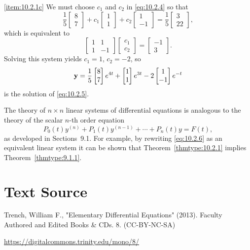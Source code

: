 \documentclass{ximera}
\begin{document}
\begin{example}
\begin{explanation}
\ref{item:10.2.1c}
We must choose $c_1$ and $c_2$ in \eqref{eq:10.2.4} so that
$$
\frac{1}{5}\begin{bmatrix}8\\7\end{bmatrix}+c_1\begin{bmatrix}1\\1\end{bmatrix}+c_2\begin{bmatrix}1\\-1\end{bmatrix}=\frac{1}{5}\begin{bmatrix}3\\22\end{bmatrix},
$$
which is equivalent to
$$
\begin{bmatrix}1&1\\1&-1\end{bmatrix}\begin{bmatrix}c_1\\c_2\end{bmatrix}=\begin{bmatrix}-1\\3\end{bmatrix}.
$$
Solving this system yields $c_1=1$, $c_2=-2$, so
$$
{\bf y}=\frac{1}{5}\begin{bmatrix}8\\7\end{bmatrix}e^{4t}+\begin{bmatrix}1\\1\end{bmatrix}e^{3t}-2\begin{bmatrix}1\\-1\end{bmatrix}e^{-t}
$$
is the solution of  \eqref{eq:10.2.5}.
\end{explanation}
\end{example}


\begin{remark}The theory of $n\times n$ linear systems of differential
equations is analogous to the theory of the scalar $n$-th order
equation
\begin{equation} \label{eq:10.2.6}
P_0(t)y^{(n)}+P_1(t)y^{(n-1)}+\cdots+P_n(t)y=F(t),
\end{equation}
as
developed in Sections~9.1. For example, by rewriting
\eqref{eq:10.2.6} as an equivalent linear system it can be shown that
Theorem~\ref{thmtype:10.2.1} implies Theorem~\ref{thmtype:9.1.1}.
\end{remark}




\section*{Text Source}
Trench, William F., "Elementary Differential Equations" (2013). Faculty Authored and Edited Books \& CDs. 8. (CC-BY-NC-SA)

\href{https://digitalcommons.trinity.edu/mono/8/}{https://digitalcommons.trinity.edu/mono/8/}
\end{document}
